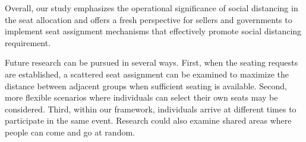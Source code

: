 Overall, our study emphasizes the operational significance of social distancing in the seat allocation and offers a fresh perspective for sellers and governments to implement seat assignment mechanisms that effectively promote social distancing requirement.


Future research can be pursued in several ways. First, when the seating requests are established, a scattered seat assignment can be examined to maximize the distance between adjacent groups when sufficient seating is available. Second, more flexible scenarios where individuals can select their own seats may be considered. Third, within our framework, individuals arrive at different times to participate in the same event. Research could also examine shared areas where people can come and go at random.


